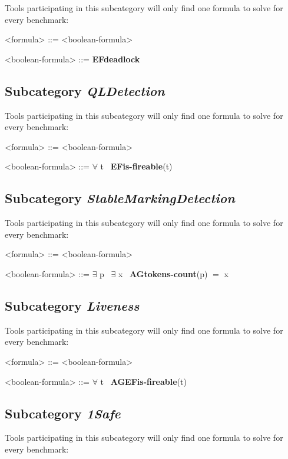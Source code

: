 \documentclass[10pt,english,a4paper]{article}
\newcommand\ctla             {\textbf{A}\xspace}
\newcommand\ctle             {\textbf{E}\xspace}
\newcommand\ltlf             {\textbf{F}\xspace}
\newcommand\ltlg             {\textbf{G}\xspace}
\newcommand\quantexist       {\boldmath$\exists$\xspace}
\newcommand\quantall         {\boldmath$\forall$\xspace}
\newcommand\atomeq          {\boldmath$=$\xspace}
\newcommand\atomdead         {\textbf{deadlock}\xspace}
\newcommand\atomisfire[1]    {\textbf{is-fireable}(#1)}
\newcommand\atomtokenscnt[1] {\textbf{tokens-count}(#1)}
\newcommand\mysubsection[1]{\color{sectioncolor}\subsection{#1}\color{defaultcolor}}
\begin{document}
Tools participating in this subcategory will only find one formula to solve
for every benchmark:

\begin{grammar}

<formula> ::= <boolean-formula>

<boolean-formula> ::= \ctle \ltlf \atomdead

\end{grammar}

\mysubsection{Subcategory \textit{QLDetection}}

Tools participating in this subcategory will only find one formula to solve
for every benchmark:

\begin{grammar}

<formula> ::= <boolean-formula>

<boolean-formula> ::= \quantall t~ \ctle \ltlf \atomisfire{t}

\end{grammar}

\mysubsection{Subcategory \textit{StableMarkingDetection}}

Tools participating in this subcategory will only find one formula to solve
for every benchmark:

\begin{grammar}

<formula> ::= <boolean-formula>

<boolean-formula> ::= \quantexist p~ \quantexist x~ \ctla \ltlg \atomtokenscnt{p} \atomeq x

\end{grammar}

\mysubsection{Subcategory \textit{Liveness}}

Tools participating in this subcategory will only find one formula to solve
for every benchmark:

\begin{grammar}

<formula> ::= <boolean-formula>

<boolean-formula> ::= \quantall t~ \ctla \ltlg \ctle \ltlf \atomisfire{t}

\end{grammar}

\mysubsection{Subcategory \textit{1Safe}}

Tools participating in this subcategory will only find one formula to solve
for every benchmark:
\end{document}
